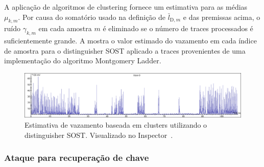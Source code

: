 A aplicação de algoritmos de clustering fornece um estimativa para as médias $\mu_{k,m}$. Por causa do somatório usado na definição de $\bar{l}_{\text{D}, m}$ e das premissas acima, o ruído $\gamma_{k,m}$ em cada amostra $m$ é eliminado se o número de traces processados é suficientemente grande. A  mostra o valor estimado do vazamento em cada índice de amostra para o distinguisher SOST aplicado a traces provenientes de uma implementação do algoritmo Montgomery Ladder.

\begin{figure}
	\centering
	\includegraphics[width=1\linewidth]{figures/Trace__Cluster_Leakage_Assessment_by_SOST_method.png}
	\caption{Estimativa de vazamento baseada em clusters utilizando o distinguisher SOST. Visualizado no Inspector~\cite{RiscureInspector}.}
	\label{fig:traceCLA_SOST}
\end{figure}

\subsubsection{Ataque para recuperação de chave}

